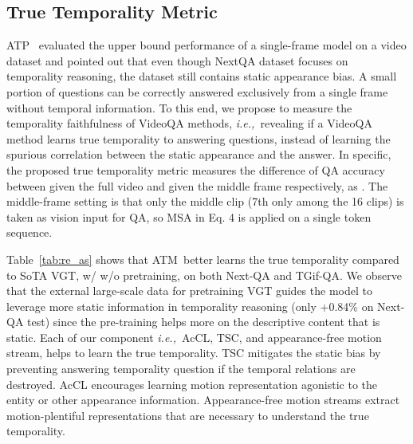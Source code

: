 \documentclass[sigconf]{acmart}
\newcommand{\methodname}{ATM~}
\newcommand{\ie}{\emph{i.e.,~}}
\begin{document}
\subsection{True Temporality Metric}
ATP~\cite{buch2022revisiting} evaluated the upper bound performance of a single-frame model on a video dataset and pointed out that even though NextQA dataset focuses on temporality reasoning, the dataset still contains static appearance bias. 
A small portion of questions can be correctly answered exclusively from a single frame without temporal information. 
To this end, we propose to measure the temporality faithfulness of VideoQA methods, \ie revealing if a VideoQA method learns true temporality to answering questions, instead of learning the spurious correlation between the static appearance and the answer. 
In specific, the proposed true temporality metric measures the difference of QA accuracy between given the full video and given the middle frame respectively, as .
The middle-frame setting is that only the middle clip (7th only among the 16 clips) is taken as vision input for QA, so MSA in Eq. 4 is applied on a single token sequence.

Table~\ref{tab:re_as} shows that \methodname better learns the true temporality compared to SoTA VGT, w/ w/o pretraining, on both Next-QA and TGif-QA. We observe that the external large-scale data for pretraining VGT guides the model to leverage more static information in temporality reasoning (only +0.84\% on Next-QA test) since the pre-training helps more on the descriptive content that is static.
Each of our component \ie AcCL, TSC, and appearance-free motion stream, helps to learn the true temporality. TSC mitigates the static bias by preventing answering temporality question if the temporal relations are destroyed. AcCL encourages learning motion representation agonistic to the entity or other appearance information. Appearance-free motion streams extract motion-plentiful representations that are necessary to understand the true temporality. 
\end{document}
